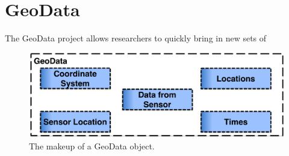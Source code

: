 \section{GeoData}

The GeoData project allows researchers to quickly bring in new sets of 

\begin{figure}[!h]
\centering
\includegraphics[width=6.0in]{geodatadiagram}
\caption{The makeup of a GeoData object.}
\label{fig:swflow}
\end{figure}